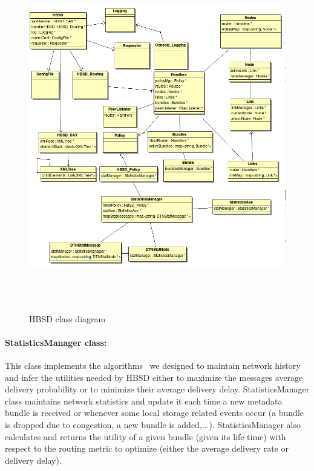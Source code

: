 \begin{figure}[!h]
\centering
\includegraphics[width=6in,height=6in]{Chapitre4/HBSDClasses.png}
\caption{HBSD class diagram}
\label{DTN2-Arch}
\end{figure}

\paragraph{StatisticsManager class:}

This class implements the algorithms~\cite{TMC:Report} we designed to maintain network history and infer the utilities needed by HBSD either to maximize the messages average delivery probability  or to minimize their average delivery delay.  
StatisticsManager class maintains network statistics and update it each time a new metadata
bundle is received or whenever some local storage related events occur (a bundle is dropped due
to congestion, a new bundle is added,...).
StatisticsManager also calculates and returns the utility of a given bundle (given its life time)
with respect to the routing metric to optimize (either the average delivery rate or delivery
delay).

